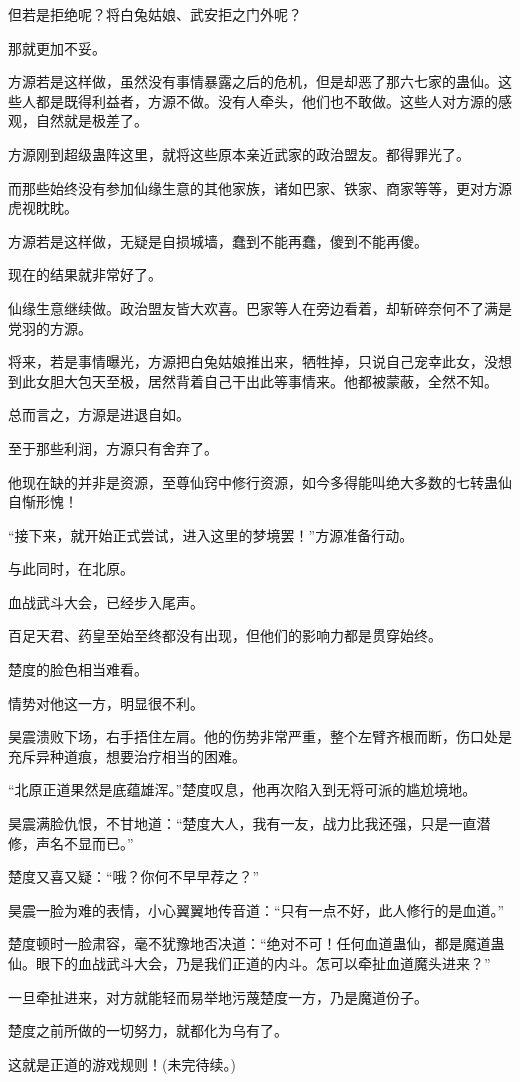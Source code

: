 \begin{this_body}
但若是拒绝呢？将白兔姑娘、武安拒之门外呢？

那就更加不妥。

方源若是这样做，虽然没有事情暴露之后的危机，但是却恶了那六七家的蛊仙。这些人都是既得利益者，方源不做。没有人牵头，他们也不敢做。这些人对方源的感观，自然就是极差了。

方源刚到超级蛊阵这里，就将这些原本亲近武家的政治盟友。都得罪光了。

而那些始终没有参加仙缘生意的其他家族，诸如巴家、铁家、商家等等，更对方源虎视眈眈。

方源若是这样做，无疑是自损城墙，蠢到不能再蠢，傻到不能再傻。

现在的结果就非常好了。

仙缘生意继续做。政治盟友皆大欢喜。巴家等人在旁边看着，却斩碎奈何不了满是党羽的方源。

将来，若是事情曝光，方源把白兔姑娘推出来，牺牲掉，只说自己宠幸此女，没想到此女胆大包天至极，居然背着自己干出此等事情来。他都被蒙蔽，全然不知。

总而言之，方源是进退自如。

至于那些利润，方源只有舍弃了。

他现在缺的并非是资源，至尊仙窍中修行资源，如今多得能叫绝大多数的七转蛊仙自惭形愧！

“接下来，就开始正式尝试，进入这里的梦境罢！”方源准备行动。

与此同时，在北原。

血战武斗大会，已经步入尾声。

百足天君、药皇至始至终都没有出现，但他们的影响力都是贯穿始终。

楚度的脸色相当难看。

情势对他这一方，明显很不利。

昊震溃败下场，右手捂住左肩。他的伤势非常严重，整个左臂齐根而断，伤口处是充斥异种道痕，想要治疗相当的困难。

“北原正道果然是底蕴雄浑。”楚度叹息，他再次陷入到无将可派的尴尬境地。

昊震满脸仇恨，不甘地道：“楚度大人，我有一友，战力比我还强，只是一直潜修，声名不显而已。”

楚度又喜又疑：“哦？你何不早早荐之？”

昊震一脸为难的表情，小心翼翼地传音道：“只有一点不好，此人修行的是血道。”

楚度顿时一脸肃容，毫不犹豫地否决道：“绝对不可！任何血道蛊仙，都是魔道蛊仙。眼下的血战武斗大会，乃是我们正道的内斗。怎可以牵扯血道魔头进来？”

一旦牵扯进来，对方就能轻而易举地污蔑楚度一方，乃是魔道份子。

楚度之前所做的一切努力，就都化为乌有了。

这就是正道的游戏规则！(未完待续。)

\end{this_body}

